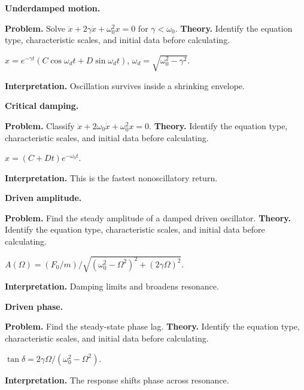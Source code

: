 \begin{workedexample}
\textbf{Underdamped motion.}\par
\textbf{Problem.} Solve $\ddot x+2\gamma\dot x+\omega_0^2x=0$ for $\gamma<\omega_0$.
\textbf{Theory.} Identify the equation type, characteristic scales, and initial data before calculating.
\begin{solution}
$x=e^{-\gamma t}(C\cos\omega_dt+D\sin\omega_dt)$, $\omega_d=\sqrt{\omega_0^2-\gamma^2}$.

\textbf{Interpretation.} Oscillation survives inside a shrinking envelope.
\end{solution}
\end{workedexample}

\begin{workedexample}
\textbf{Critical damping.}\par
\textbf{Problem.} Classify $\ddot x+2\omega_0\dot x+\omega_0^2x=0$.
\textbf{Theory.} Identify the equation type, characteristic scales, and initial data before calculating.
\begin{solution}
$x=(C+Dt)e^{-\omega_0t}$.

\textbf{Interpretation.} This is the fastest nonoscillatory return.
\end{solution}
\end{workedexample}

\begin{workedexample}
\textbf{Driven amplitude.}\par
\textbf{Problem.} Find the steady amplitude of a damped driven oscillator.
\textbf{Theory.} Identify the equation type, characteristic scales, and initial data before calculating.
\begin{solution}
$A(\Omega)=(F_0/m)/\sqrt{(\omega_0^2-\Omega^2)^2+(2\gamma\Omega)^2}$.

\textbf{Interpretation.} Damping limits and broadens resonance.
\end{solution}
\end{workedexample}

\begin{workedexample}
\textbf{Driven phase.}\par
\textbf{Problem.} Find the steady-state phase lag.
\textbf{Theory.} Identify the equation type, characteristic scales, and initial data before calculating.
\begin{solution}
$\tan\delta=2\gamma\Omega/(\omega_0^2-\Omega^2)$.

\textbf{Interpretation.} The response shifts phase across resonance.
\end{solution}
\end{workedexample}

